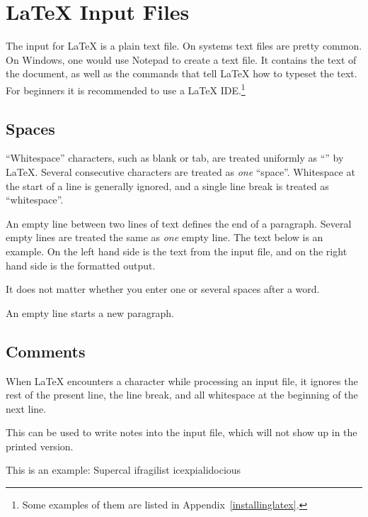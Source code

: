\section{\LaTeX{} Input Files}

The input for \LaTeX{} is a plain text file. On \Unix{} systems text files are
pretty common. On Windows, one would use Notepad to create a text file. It
contains the text of the document, as well as the commands that tell \LaTeX{}
how to typeset the text. For beginners it is recommended to use a \LaTeX{}
IDE.\footnote{Some examples of them are listed in
  Appendix~\ref{installinglatex}.}

\subsection{Spaces}\label{sec:spaces}

\enquote{Whitespace} characters, such as blank or tab, are treated uniformly as
\enquote{} by \LaTeX{}. Several consecutive 
characters are treated as \emph{one} \enquote{space}. Whitespace at the start
of a line is generally ignored, and a single line break is treated as
\enquote{whitespace}.

An empty line between two lines of text defines the end of a paragraph. Several
empty lines are treated the same as \emph{one} empty line. The text below is an
example. On the left hand side is the text from the input file, and on the
right hand side is the formatted output.

\begin{example}
It does not matter whether you
enter one or several     spaces
after a word.

An empty line starts a new
paragraph.
\end{example}

\subsection{Comments}

When \LaTeX{} encounters a \ai{\%} character while processing an input file,
it ignores the rest of the present line, the line break, and all
whitespace at the beginning of the next line.

This can be used to write notes into the input file, which will not show up
in the printed version.

\begin{example}
This is an %
example: Supercal%
              ifragilist%
    icexpialidocious
\end{example}

